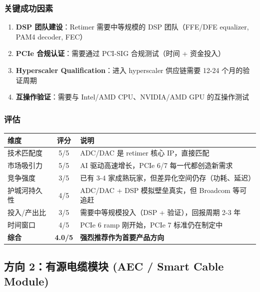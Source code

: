\documentclass[11pt,a4paper]{ctexart}
\begin{document}
\subsubsection{关键成功因素}

\begin{enumerate}
    \item \textbf{DSP 团队建设}：Retimer 需要中等规模的 DSP 团队（FFE/DFE equalizer, PAM4 decoder, FEC）
    \item \textbf{PCIe 合规认证}：需要通过 PCI-SIG 合规测试（时间 + 资金投入）
    \item \textbf{Hyperscaler Qualification}：进入 hyperscaler 供应链需要 12-24 个月的验证周期
    \item \textbf{互操作验证}：需要与 Intel/AMD CPU、NVIDIA/AMD GPU 的互操作测试
\end{enumerate}

\subsubsection{评估}

\begin{table}[htb]
    \centering
    \begin{tabular}{l c p{}}
        \toprule
        \textbf{维度} & \textbf{评分} & \textbf{说明} \\
        \midrule
        技术匹配度 & 5/5 & ADC/DAC 是 retimer 核心 IP，直接匹配 \\
        市场吸引力 & 5/5 & AI 驱动高速增长，PCIe 6/7 每一代都创造新需求 \\
        竞争强度 & 3/5 & 已有 3-4 家成熟玩家，但差异化空间仍存（功耗、延迟） \\
        护城河持久性 & 4/5 & ADC/DAC + DSP 模拟壁垒真实，但 Broadcom 等可追赶 \\
        投入/产出比 & 3/5 & 需要中等规模投入（DSP + 验证），回报周期 2-3 年 \\
        时间窗口 & 4/5 & PCIe 6 ramp 刚开始，PCIe 7 标准仍在制定中 \\
        \midrule
        \rowcolor{strong}
        \textbf{综合} & \textbf{4.0/5} & \textbf{强烈推荐作为首要产品方向} \\
        \bottomrule
    \end{tabular}
\end{table}

\subsection{方向 2：有源电缆模块 (AEC / Smart Cable Module)}
\end{document}
